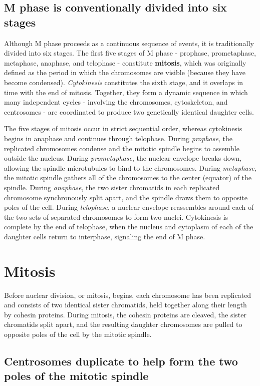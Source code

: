\subsection{M phase is conventionally divided into six stages}

Although M phase proceeds as a continuous sequence of events, it is
traditionally divided into six stages. The first five stages of M phase -
prophase, prometaphase, metaphase, anaphase, and telophase - constitute
\textbf{mitosis}, which was originally defined as the period in which the chromosomes
are visible (because they have become condensed). \textit{Cytokinesis}
constitutes the sixth stage, and it overlaps in time with the end of mitosis.
Together, they form a dynamic sequence in which many independent
cycles - involving the chromosomes, cytoskeleton, and centrosomes -
are coordinated to produce two genetically identical daughter cells.

The five stages of mitosis occur in strict sequential order, whereas cytokinesis
begins in anaphase and continues through telophase. During
\textit{prophase}, the replicated chromosomes condense and the mitotic spindle
begins to assemble outside the nucleus. During \textit{prometaphase}, the
nuclear envelope breaks down, allowing the spindle microtubules to bind
to the chromosomes. During \textit{metaphase}, the mitotic spindle gathers all of
the chromosomes to the center (equator) of the spindle. During \textit{anaphase},
the two sister chromatids in each replicated chromosome synchronously
split apart, and the spindle draws them to opposite poles of the cell.
During \textit{telophase}, a nuclear envelope reassembles around each of the
two sets of separated chromosomes to form two nuclei.
Cytokinesis is complete by the end of telophase, when the
nucleus and cytoplasm of each of the daughter cells return to interphase,
signaling the end of M phase.

\section{Mitosis}

Before nuclear division, or mitosis, begins, each chromosome has been
replicated and consists of two identical sister chromatids, held together
along their length by cohesin proteins. During mitosis, the cohesin
proteins are cleaved, the sister chromatids split apart,
and the resulting daughter chromosomes are pulled to opposite poles of
the cell by the mitotic spindle.

\subsection{Centrosomes duplicate to help form the two poles of the mitotic spindle}

